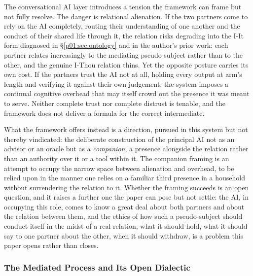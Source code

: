 \documentclass[11pt,a4paper]{article}
\begin{document}
The conversational AI layer introduces a tension the framework can frame but not fully resolve. The danger is relational alienation. If the two partners come to rely on the AI completely, routing their understanding of one another and the conduct of their shared life through it, the relation risks degrading into the I-It form diagnosed in §\ref{p01:sec:ontology} and in the author's prior work: each partner relates increasingly to the mediating pseudo-subject rather than to the other, and the genuine I-Thou relation thins. Yet the opposite posture carries its own cost. If the partners trust the AI not at all, holding every output at arm's length and verifying it against their own judgement, the system imposes a continual cognitive overhead that may itself crowd out the presence it was meant to serve. Neither complete trust nor complete distrust is tenable, and the framework does not deliver a formula for the correct intermediate.

What the framework offers instead is a direction, pursued in this system but not thereby vindicated: the deliberate construction of the principal AI not as an advisor or an oracle but as a \emph{companion}, a presence alongside the relation rather than an authority over it or a tool within it. The companion framing is an attempt to occupy the narrow space between alienation and overhead, to be relied upon in the manner one relies on a familiar third presence in a household without surrendering the relation to it. Whether the framing succeeds is an open question, and it raises a further one the paper can pose but not settle: the AI, in occupying this role, comes to know a great deal about both partners and about the relation between them, and the ethics of how such a pseudo-subject should conduct itself in the midst of a real relation, what it should hold, what it should say to one partner about the other, when it should withdraw, is a problem this paper opens rather than closes.

\subsubsection{The Mediated Process and Its Open Dialectic}\label{p01:sec:open-dialectic}
\end{document}
